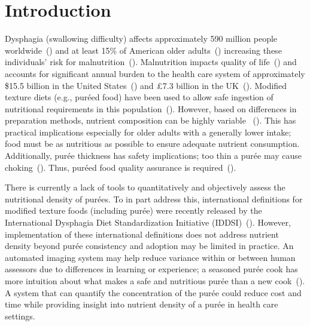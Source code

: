 \documentclass[authoryear]{elsarticle}
\begin{document}

\section{Introduction}
Dysphagia (swallowing difficulty) affects approximately 590 million people worldwide~(\cite{Cichero2016}) and at least 15\% of American older adults~(\cite{sura2012}) increasing these individuals' risk for malnutrition~(\cite{ilhamto2014,sura2012}). Malnutrition impacts quality of life~(\cite{keller2004}) and accounts for significant annual burden to the health care system of approximately \$15.5 billion in the United States~(\cite{goates2016}) and £7.3 billion in the UK~(\cite{russell2007}). Modified texture diets (e.g., pur\' eed food) have been used to allow safe ingestion of nutritional requirements in this population~(\cite{germain2006}). However, based on differences in preparation methods, nutrient composition can be highly variable ~(\cite{ilhamto2014}). This has practical implications especially for older adults with a generally lower intake; food must be as nutritious as possible to ensure adequate nutrient consumption. Additionally, pur\' ee thickness has safety implications; too thin a pur\' ee may cause choking~(\cite{ilhamto2014}). Thus, pur\' eed food quality assurance is required~(\cite{ilhamto2014}). 

There is currently a lack of tools to quantitatively and objectively assess the nutritional density of pur\' ees. To in part address this, international definitions for modified texture foods (including pur\' ee) were recently released by the International Dysphagia Diet Standardization Initiative (IDDSI)~(\cite{Cichero2016}).  However, implementation of these international definitions does not address nutrient density beyond pur\' ee consistency and adoption may be limited in practice. An automated imaging system may help reduce variance within or between human assessors due to differences in learning or experience; a seasoned pur\' ee cook has more intuition about what makes a safe and nutritious pur\' ee than a new cook~(\cite{ilhamto2014}). A system that can quantify the concentration of the pur\' ee could reduce cost and time while providing insight into nutrient density of a pur\' ee in health care settings.
\end{document}

